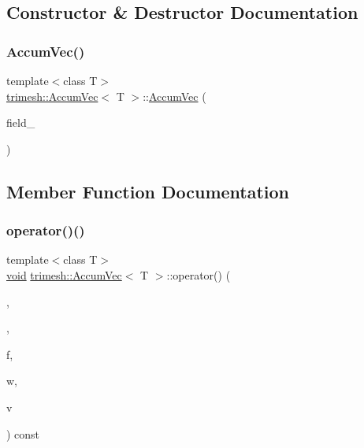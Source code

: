 \subsection{Constructor \& Destructor Documentation}
\mbox{\label{structtrimesh_1_1AccumVec_a1f2a837cd65c6efc4bc003d429ae8f43}} 
\subsubsection{\texorpdfstring{Accum\+Vec()}{AccumVec()}}
{\footnotesize\ttfamily template$<$class T$>$ \\
\hyperlink{structtrimesh_1_1AccumVec}{trimesh\+::\+Accum\+Vec}$<$ T $>$\+::\hyperlink{structtrimesh_1_1AccumVec}{Accum\+Vec} (\begin{DoxyParamCaption}\item[{const vector$<$ T $>$ \&}]{field\+\_\+ }\end{DoxyParamCaption})\hspace{0.3cm}{\ttfamily [inline]}}



\subsection{Member Function Documentation}
\mbox{\label{structtrimesh_1_1AccumVec_a65a3ac9c7b655346db533ee274940637}} 
\subsubsection{\texorpdfstring{operator()()}{operator()()}}
{\footnotesize\ttfamily template$<$class T$>$ \\
\hyperlink{namespacetrimesh_a784ddfd979e1c579bda795a8edfc3f43}{void} \hyperlink{structtrimesh_1_1AccumVec}{trimesh\+::\+Accum\+Vec}$<$ T $>$\+::operator() (\begin{DoxyParamCaption}\item[{const \hyperlink{classtrimesh_1_1TriMesh}{Tri\+Mesh} $\ast$}]{,  }\item[{int}]{,  }\item[{T \&}]{f,  }\item[{float}]{w,  }\item[{int}]{v }\end{DoxyParamCaption}) const\hspace{0.3cm}{\ttfamily [inline]}}



